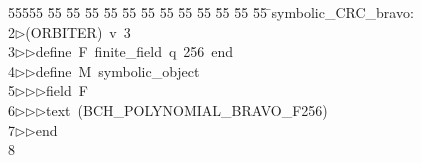%
%
\begin{tabbing}
55555 \= 55 \= 55 \= 55 \= 55 \= 55 \= 55 \= 55 \= 55 \= 55 \= 55 \= 55 \= 55 \= \>symbolic\_CRC\_bravo:\\[0pt]
2\>$\triangleright$\>(ORBITER)\ v\ 3\ \\[0pt]
3\>$\triangleright$\>$\triangleright$\>define\ F\ finite\_field\ q\ 256\ end\ \\[0pt]
4\>$\triangleright$\>$\triangleright$\>define\ M\ symbolic\_object\ \\[0pt]
5\>$\triangleright$\>$\triangleright$\>$\triangleright$\>field\ F\ \\[0pt]
6\>$\triangleright$\>$\triangleright$\>$\triangleright$\>text\ (BCH\_POLYNOMIAL\_BRAVO\_F256)\ \\[0pt]
7\>$\triangleright$\>$\triangleright$\>end\ \\[0pt]
8\>\end{tabbing}
